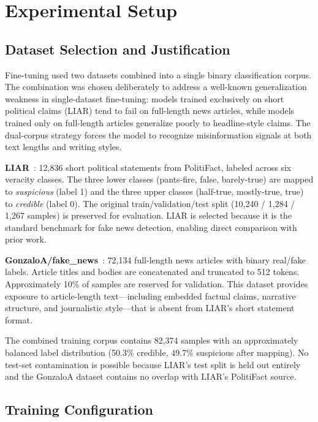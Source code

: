 \documentclass[journal]{IEEEtran}
\begin{document}
\section{Experimental Setup}
\label{sec:setup}

\subsection{Dataset Selection and Justification}

Fine-tuning used two datasets combined into a single binary classification corpus. The
combination was chosen deliberately to address a well-known generalization weakness in
single-dataset fine-tuning: models trained exclusively on short political claims (LIAR) tend
to fail on full-length news articles, while models trained only on full-length articles
generalize poorly to headline-style claims. The dual-corpus strategy forces the model to
recognize misinformation signals at both text lengths and writing styles.

\textbf{LIAR}~\cite{wang2017liar}: 12,836 short political statements from PolitiFact,
labeled across six veracity classes. The three lower classes (pants-fire, false, barely-true)
are mapped to \textit{suspicious} (label 1) and the three upper classes (half-true,
mostly-true, true) to \textit{credible} (label 0). The original train/validation/test split
(10,240 / 1,284 / 1,267 samples) is preserved for evaluation. LIAR is selected because it
is the standard benchmark for fake news detection, enabling direct comparison with prior
work.

\textbf{GonzaloA/fake\_news}~\cite{gonzaloa2020}: 72,134 full-length news articles with
binary real/fake labels. Article titles and bodies are concatenated and truncated to 512
tokens. Approximately 10\% of samples are reserved for validation. This dataset provides
exposure to article-length text—including embedded factual claims, narrative structure, and
journalistic style—that is absent from LIAR's short statement format.

The combined training corpus contains 82,374 samples with an approximately balanced label
distribution (50.3\% credible, 49.7\% suspicious after mapping). No test-set contamination
is possible because LIAR's test split is held out entirely and the GonzaloA dataset contains
no overlap with LIAR's PolitiFact source.

\subsection{Training Configuration}
\end{document}
